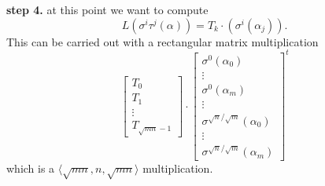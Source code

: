 \textbf{step 4.} at this point we want to compute 
$$L(\sigma^i\tau^j(\alpha)) = T_k\cdot(\sigma^i(\alpha_j)).$$
This can be carried out with a rectangular matrix multiplication
$$
\left[ \begin{array}{c}
T_0\\
\hline
T_1\\
\hline
\vdots\\
\hline
T_{\sqrt{mn}-1}
\end{array} 
\right]
\cdot
\left[\begin{array}{l}
\sigma^0(\alpha_0) \\
\hline
 \vdots \\
 \hline
 \sigma^{0}(\alpha_m) \\
 \hline
\vdots \\
\hline
\sigma^{\sqrt{n}/\sqrt{m}}(\alpha_0) \\
\hline
\vdots \\
\hline
\sigma^{\sqrt{n}/\sqrt{m}}(\alpha_m)
\end{array}
\right]^t
$$
which is a $\langle \sqrt{mn},n,\sqrt{mn}\rangle$ multiplication.  
 

